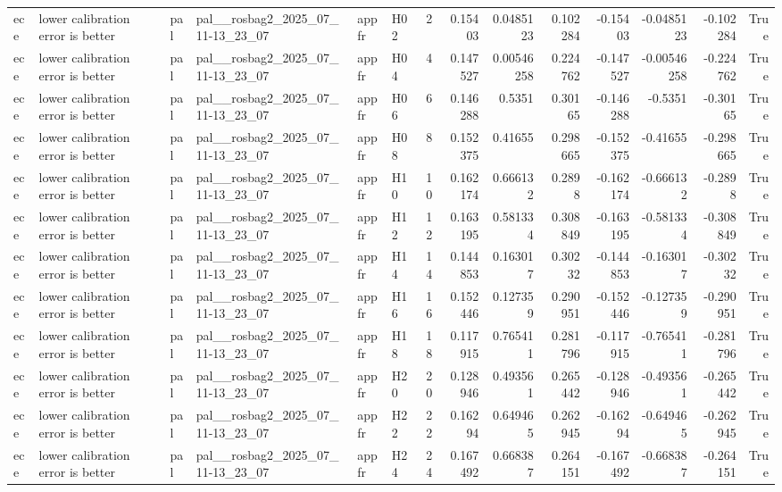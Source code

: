 \begin{longtable}{llllllrrrrrrrr}
ece & lower calibration error is better & pal & pal\_\_rosbag2\_2025\_07\_11-13\_23\_07 & appfr & H02 & 2 & 0.15403 & 0.0485123 & 0.102284 & -0.15403 & -0.0485123 & -0.102284 & True \\
ece & lower calibration error is better & pal & pal\_\_rosbag2\_2025\_07\_11-13\_23\_07 & appfr & H04 & 4 & 0.147527 & 0.00546258 & 0.224762 & -0.147527 & -0.00546258 & -0.224762 & True \\
ece & lower calibration error is better & pal & pal\_\_rosbag2\_2025\_07\_11-13\_23\_07 & appfr & H06 & 6 & 0.146288 & 0.5351 & 0.30165 & -0.146288 & -0.5351 & -0.30165 & True \\
ece & lower calibration error is better & pal & pal\_\_rosbag2\_2025\_07\_11-13\_23\_07 & appfr & H08 & 8 & 0.152375 & 0.41655 & 0.298665 & -0.152375 & -0.41655 & -0.298665 & True \\
ece & lower calibration error is better & pal & pal\_\_rosbag2\_2025\_07\_11-13\_23\_07 & appfr & H10 & 10 & 0.162174 & 0.666132 & 0.2898 & -0.162174 & -0.666132 & -0.2898 & True \\
ece & lower calibration error is better & pal & pal\_\_rosbag2\_2025\_07\_11-13\_23\_07 & appfr & H12 & 12 & 0.163195 & 0.581334 & 0.308849 & -0.163195 & -0.581334 & -0.308849 & True \\
ece & lower calibration error is better & pal & pal\_\_rosbag2\_2025\_07\_11-13\_23\_07 & appfr & H14 & 14 & 0.144853 & 0.163017 & 0.30232 & -0.144853 & -0.163017 & -0.30232 & True \\
ece & lower calibration error is better & pal & pal\_\_rosbag2\_2025\_07\_11-13\_23\_07 & appfr & H16 & 16 & 0.152446 & 0.127359 & 0.290951 & -0.152446 & -0.127359 & -0.290951 & True \\
ece & lower calibration error is better & pal & pal\_\_rosbag2\_2025\_07\_11-13\_23\_07 & appfr & H18 & 18 & 0.117915 & 0.765411 & 0.281796 & -0.117915 & -0.765411 & -0.281796 & True \\
ece & lower calibration error is better & pal & pal\_\_rosbag2\_2025\_07\_11-13\_23\_07 & appfr & H20 & 20 & 0.128946 & 0.493561 & 0.265442 & -0.128946 & -0.493561 & -0.265442 & True \\
ece & lower calibration error is better & pal & pal\_\_rosbag2\_2025\_07\_11-13\_23\_07 & appfr & H22 & 22 & 0.16294 & 0.649465 & 0.262945 & -0.16294 & -0.649465 & -0.262945 & True \\
ece & lower calibration error is better & pal & pal\_\_rosbag2\_2025\_07\_11-13\_23\_07 & appfr & H24 & 24 & 0.167492 & 0.668387 & 0.264151 & -0.167492 & -0.668387 & -0.264151 & True \\

\end{longtable}
